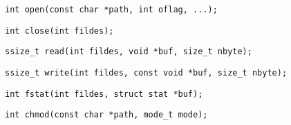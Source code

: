 \begin{verbatim}
int open(const char *path, int oflag, ...);
\end{verbatim}

\begin{verbatim}
int close(int fildes);
\end{verbatim}

\begin{verbatim}
ssize_t read(int fildes, void *buf, size_t nbyte);
\end{verbatim}

\begin{verbatim}
ssize_t write(int fildes, const void *buf, size_t nbyte);
\end{verbatim}

\begin{verbatim}
int fstat(int fildes, struct stat *buf);
\end{verbatim}

%
\begin{verbatim}
int chmod(const char *path, mode_t mode);
\end{verbatim}

